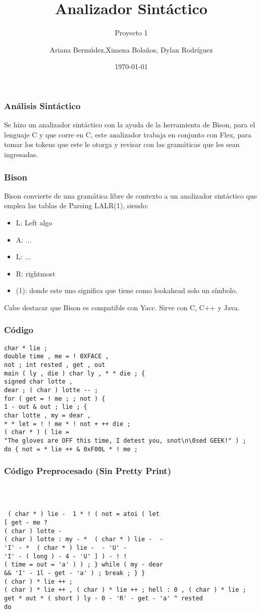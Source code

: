 \documentclass{beamer}
\title{Analizador Sint\'actico}
\subtitle{Proyecto 1}
\author{Ariana Berm\'udez,Ximena Bola\~nos, Dylan Rodr\'iguez}
\institute{Instituto Tecnol\'ogico de Costa Rica}
\date{\today}
\begin{document}
\begin{frame}
 \titlepage 
 \end{frame}\begin{frame}
 \frametitle{An\'alisis Sint\'actico}
  Se hizo un analizador sint\'actico con la ayuda de la herramienta de Bison, para el lenguaje C y que corre en C, este analizador trabaja en conjunto con Flex, para tomar los tokens que este le otorga y revisar con las gram\'aticas que les sean ingresadas. \end{frame}\begin{frame}
 \frametitle{Bison}
 Bison convierte de una gram\'atica libre de contexto a un analizador sint\'actico que emplea las tablas de Parsing LALR(1), siendo: \begin{itemize} \item L: Left algo \item A: ... \item L: ... \item R: rightmost \item (1): donde este uno significa que tiene como lookahead solo un s\'imbolo. \end{itemize} Cabe destacar que Bison es compatible con Yacc. Sirve con C, C++ y Java. \end{frame}\begin{frame}[fragile]
\frametitle{C\'odigo}
\begin{lstlisting}[style=CStyle]
char * lie ; 
double time , me = ! 0XFACE , 
not ; int rested , get , out 
main ( ly , die ) char ly , * * die ; { 
signed char lotte , 
dear ; ( char ) lotte -- ; 
for ( get = ! me ; ; not ) { 
1 - out & out ; lie ; { 
char lotte , my = dear , 
* * let = ! ! me * ! not + ++ die ; 
( char * ) ( lie = 
"The gloves are OFF this time, I detest you, snot\n\0sed GEEK!" ) ; 
do { not = * lie ++ & 0xF00L * ! me ; 
\end{lstlisting}
\end{frame}
\begin{frame}[fragile]
\frametitle{C\'odigo Preprocesado (Sin Pretty Print)}
\begin{lstlisting}[style=CStyle]


 
 ( char * ) lie -  1 * ! ( not = atoi ( let 
[ get - me ? 
( char ) lotte - 
( char ) lotte : my - *  ( char * ) lie -  - 
'I' - *  ( char * ) lie -  - 'U' - 
'I' - ( long ) - 4 - 'U' ] ) - ! ! 
( time = out = 'a' ) ) ; } while ( my - dear 
&& 'I' - 1l - get - 'a' ) ; break ; } } 
( char ) * lie ++ ; 
( char ) * lie ++ , ( char ) * lie ++ ; hell : 0 , ( char ) * lie ; 
get * out * ( short ) ly - 0 - 'R' - get - 'a' ^ rested 
do \end{lstlisting}
\end{frame}
\end{document}
